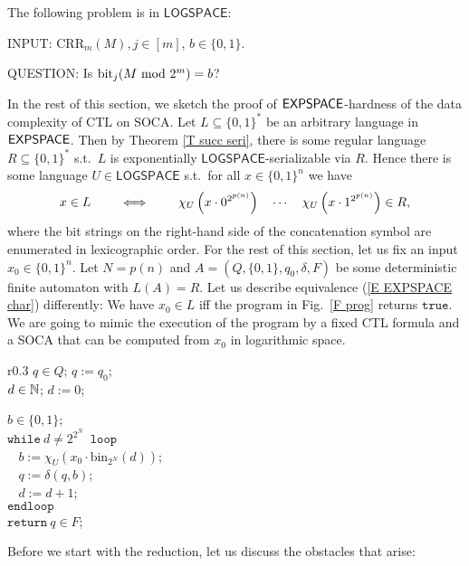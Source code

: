 \documentclass[times,envcountsame]{llncs}
\renewcommand{\mod}{\text{mod }}
\newcommand{\modulo}{\mod}
\def\CRR{{\mathrm{CRR}}}
\renewcommand{\L}{\mathsf{LOGSPACE}}
\begin{document}
\begin{theorem}{\label{T CRRBIN}}
The following problem is in $\L$:

INPUT: $\CRR_m(M),j\in[m]$, $b\in\{0,1\}$.

QUESTION: Is $\bit_j(M\ \modulo 2^m)=b$?
\end{theorem}
In the rest of this section, we sketch the proof of ${\mathsf{EXPSPACE}}$-hardness of
the data complexity of CTL on SOCA.
Let $L\subseteq\{0,1\}^*$ be an arbitrary language in ${\mathsf{EXPSPACE}}$.
Then by Theorem \ref{T succ seri}, there is some regular
language $R\subseteq\{0,1\}^*$ s.t.\ $L$ is exponentially
$\L$-serializable via $R$. Hence there is some
language $U\in\L$ s.t.\ for all $x\in\{0,1\}^n$ we have\\[-0.2cm]
\begin{eqnarray}{\label{E EXPSPACE char}}
x\in L\qquad\iff\qquad \chi_{U}\left(x \cdot 0^{2^{p(n)}}\right)
\quad \cdots\quad \chi_U\left(x \cdot 1^{2^{p(n)}}\right) \in R,
\end{eqnarray}
\noindent
where the bit strings on the right-hand side of the concatenation
symbol are enumerated in lexicographic order.  For the rest of this
section, let us fix an input $x_0\in\{0,1\}^n$.  Let $N=p(n)$ and
$A=(Q,\{0,1\},q_0,\delta,F)$ be some deterministic finite automaton
with $L(A)=R$.  Let us describe equivalence (\ref{E EXPSPACE char})
differently: We have $x_0\in L$ iff the program in Fig.\ \ref{F prog}
returns $\mathtt{true}$.  We are going to mimic the execution of the
program by a fixed CTL formula and a SOCA that can be computed from
$x_0$ in logarithmic space.
\begin{wrapfigure}{r}{0.3\textwidth}
\normalsize
\vspace{-0.5cm}
 $q\in Q$; $q:=q_0$;\\[-0.4cm]

 $d\in\mathbb{N}$; $d:=0$;

$b\in\{0,1\}$;\\[-0.4cm]

 $\mathtt{while }\  d\not=2^{2^N}$\ $\mathtt{ loop}$\\[-0.4cm]

$\ \ \ \ b:=\chi_U(x_0\cdot\text{bin}_{2^N}(d))$;\\[-0.4cm]

 $\ \ \ \ q:=\delta(q,b)$;\\[-0.4cm]

$\ \ \ \ d:=d+1$;\\[-0.4cm]

$\mathtt{end loop}$\\[-0.4cm]

 $\mathtt{return}\ q\in F$;%

\caption{A program that returns $\mathtt{true}$ iff $x_0\in L$.}{\label{F
U}}{\label{F prog}}
\vspace{-0.3cm}
\end{wrapfigure}
Before we start with the reduction, let us discuss the obstacles
that arise:
\end{document}
